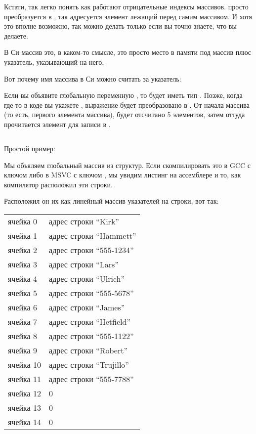 Кстати, так легко понять как работают отрицательные индексы массивов.  просто преобразуется в ,
так адресуется элемент лежащий перед самим массивом.
И хотя это вполне возможно, так можно делать только если вы точно знаете, что вы делаете.

В Си массив это, в каком-то смысле, это просто место в памяти под массив плюс указатель, указывающий
на него. 

Вот почему имя массива в Си можно считать за указатель:

Если вы объявите глобальную переменную , то  будет иметь тип .
Позже, когда где-то в коде
вы укажете , выражение будет преобразовано в . От начала массива (то есть, первого элемента
массива), будет отсчитано 5 элементов, затем оттуда прочитается элемент для записи в .

\subsection{}

Простой пример:



Мы объяляем глобальный массив из структур. Если скомпилировать это в GCC с ключом  либо в MSVC с ключом
, мы увидим листинг на ассемблере и то, как компилятор расположил эти строки. 

Расположил он их как линейный массив указателей на строки, вот так:

\begin{center}
\begin{tabular}{ | l | l | }
\hline
  ячейка 0    & адрес строки ``Kirk'' \\
  ячейка 1    & адрес строки ``Hammett'' \\
  ячейка 2    & адрес строки ``555-1234'' \\
  ячейка 3    & адрес строки ``Lars'' \\
  ячейка 4    & адрес строки ``Ulrich'' \\
  ячейка 5    & адрес строки ``555-5678'' \\
  ячейка 6    & адрес строки ``James'' \\
  ячейка 7    & адрес строки ``Hetfield'' \\
  ячейка 8    & адрес строки ``555-1122'' \\
  ячейка 9    & адрес строки ``Robert'' \\
  ячейка 10   & адрес строки ``Trujillo'' \\
  ячейка 11   & адрес строки ``555-7788'' \\
  ячейка 12   & 0 \\
  ячейка 13   & 0 \\
  ячейка 14   & 0 \\
\hline
\end{tabular}
\end{center}

